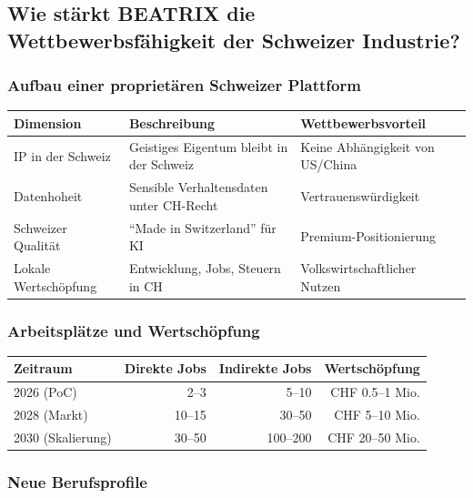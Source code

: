 \documentclass[11pt,a4paper]{article}
\begin{document}
\subsection{Wie stärkt BEATRIX die Wettbewerbsfähigkeit der Schweizer Industrie?}

\subsubsection{Aufbau einer proprietären Schweizer Plattform}

\begin{table}[h]
\centering
\begin{tabularx}{\textwidth}{lXX}
\toprule
\textbf{Dimension} & \textbf{Beschreibung} & \textbf{Wettbewerbsvorteil} \\
\midrule
IP in der Schweiz & Geistiges Eigentum bleibt in der Schweiz & Keine Abhängigkeit von US/China \\
Datenhoheit & Sensible Verhaltensdaten unter CH-Recht & Vertrauenswürdigkeit \\
Schweizer Qualität & ``Made in Switzerland'' für KI & Premium-Positionierung \\
Lokale Wertschöpfung & Entwicklung, Jobs, Steuern in CH & Volkswirtschaftlicher Nutzen \\
\bottomrule
\end{tabularx}
\end{table}

\subsubsection{Arbeitsplätze und Wertschöpfung}

\begin{table}[h]
\centering
\begin{tabular}{lrrr}
\toprule
\textbf{Zeitraum} & \textbf{Direkte Jobs} & \textbf{Indirekte Jobs} & \textbf{Wertschöpfung} \\
\midrule
2026 (PoC) & 2--3 & 5--10 & CHF 0.5--1 Mio. \\
2028 (Markt) & 10--15 & 30--50 & CHF 5--10 Mio. \\
2030 (Skalierung) & 30--50 & 100--200 & CHF 20--50 Mio. \\
\bottomrule
\end{tabular}
\end{table}

\subsubsection{Neue Berufsprofile}
\end{document}
